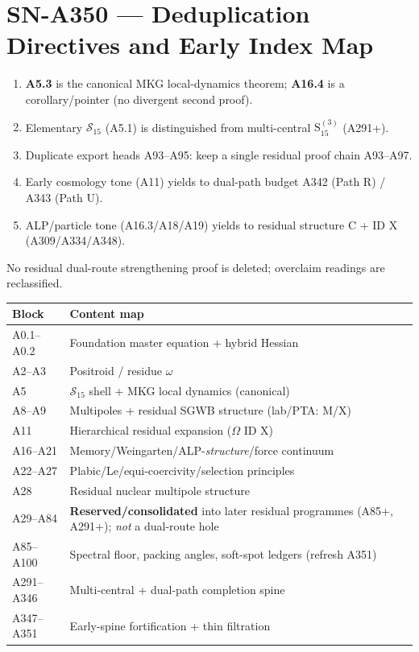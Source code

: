 \section{SN-A350 --- Deduplication Directives and Early Index Map}
\label{sec:SN-A350}

\begin{theorem}
\label{thm:A350-dedup}
\begin{enumerate}[label=(\roman*)]
\item \textbf{A5.3} is the canonical MKG local-dynamics theorem; \textbf{A16.4} is a corollary/pointer (no divergent second proof).
\item Elementary $\mathcal{S}_{15}$ (A5.1) is distinguished from multi-central $\mathrm{S}_{15}^{(3)}$ (A291+).
\item Duplicate export heads A93--A95: keep a single residual proof chain A93--A97.
\item Early cosmology tone (A11) yields to dual-path budget A342 (Path R) / A343 (Path U).
\item ALP/particle tone (A16.3/A18/A19) yields to residual structure C + ID X (A309/A334/A348).
\end{enumerate}
No residual dual-route strengthening proof is deleted; overclaim readings are reclassified.
\end{theorem}

\begin{theorem}
\label{thm:A350-index}
\begin{center}
\begin{tabular}{@{}p{3.0cm}p{9.0cm}@{}}
\toprule
Block & Content map \\
\midrule
A0.1--A0.2 & Foundation master equation + hybrid Hessian \\
A2--A3 & Positroid / residue $\omega$ \\
A5 & $\mathcal{S}_{15}$ shell + MKG local dynamics (canonical) \\
A8--A9 & Multipoles + residual SGWB structure (lab/PTA: M/X) \\
A11 & Hierarchical residual expansion ($\Omega$ ID X) \\
A16--A21 & Memory/Weingarten/ALP-\emph{structure}/force continuum \\
A22--A27 & Plabic/Le/equi-coercivity/selection principles \\
A28 & Residual nuclear multipole structure \\
A29--A84 & \textbf{Reserved/consolidated} into later residual programmes (A85+, A291+); \emph{not} a dual-route hole \\
A85--A100 & Spectral floor, packing angles, soft-spot ledgers (refresh A351) \\
A291--A346 & Multi-central + dual-path completion spine \\
A347--A351 & Early-spine fortification + thin filtration \\
\bottomrule
\end{tabular}
\end{center}
\end{theorem}

